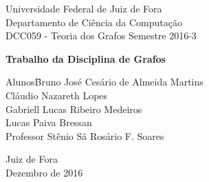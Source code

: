 \documentclass[a4paper, 12pt]{article}
\begin{document}

\begin{titlepage}
	\begin{center}
	{\large
		\hspace*{0cm}Universidade Federal de Juiz de Fora} \\
        \hspace*{0cm}Departamento de Ciência da Computação \\
        \hspace*{0cm}DCC059 - Teoria dos Grafos Semestre 2016-3  \\

\vspace{10pt}

        
        \vspace{85pt}
        
		\textbf{\LARGE{Trabalho da Disciplina de Grafos}}
		\vspace{160pt}
		
	\end{center}
	
	\begin{flushleft}
		\begin{tabbing}
			Alunos\qquad\qquad\= Bruno José Cesário de Almeida Martins\\
			\> Cláudio Nazareth Lopes\\
            \> Gabriell Lucas Ribeiro Medeiros\\
            \> Lucas Paiva Bressan \\
			Professor\> Stênio Sã Rosário F. Soares \\
		
	\end{tabbing}
		  
	\end{flushleft}
	
	\begin{center}
		\vspace{\fill}
		\vspace{2cm}
			{\center Juiz de Fora \\[3mm]
			Dezembro de 2016 \\}
	\end{center}
\end{titlepage}
\newpage
\tableofcontents
\thispagestyle{empty}
\end{document}
